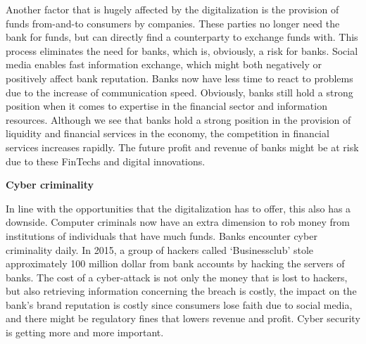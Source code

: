 \documentclass[DIV=calc, paper=a4, fontsize=11pt, twocolumn]{scrartcl}	 %
\begin{document}
Another factor that is hugely affected by the digitalization is the provision of funds from-and-to consumers by companies. These parties no longer need the bank for funds, but can directly find a counterparty to exchange funds with. This process eliminates the need for banks, which is, obviously, a risk for banks. Social media enables fast information exchange, which might both negatively or positively affect bank reputation. Banks now have less time to react to problems due to the increase of communication speed. Obviously, banks still hold a strong position when it comes to expertise in the financial sector and information resources. Although we see that banks hold a strong position in the provision of liquidity and financial services in the economy, the competition in financial services increases rapidly. The future profit and revenue of banks might be at risk due to these FinTechs and digital innovations.

\textbf{Cyber criminality}

In line with the opportunities that the digitalization has to offer, this also has a downside. Computer criminals now have an extra dimension to rob money from institutions of individuals that have much funds. Banks encounter cyber criminality daily. In 2015, a group of hackers called ‘Businessclub’ stole approximately 100 million dollar from bank accounts by hacking the servers of banks. The cost of a cyber-attack is not only the money that is lost to hackers, but also retrieving information concerning the breach is costly, the impact on the bank’s brand reputation is costly since consumers lose faith due to social media, and there might be regulatory fines that lowers revenue and profit. Cyber security is getting more and more important.

\end{document}
